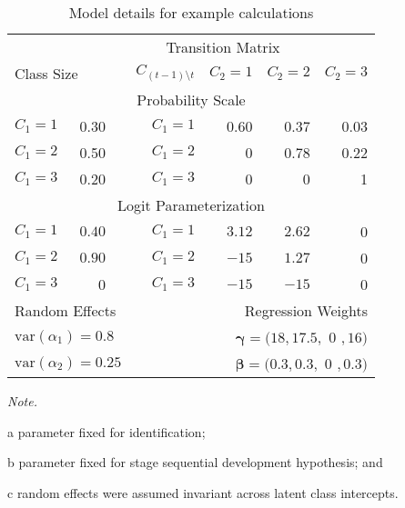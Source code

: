 \documentclass[12pt]{article}
\begin{document}
\begin{table}[!htp]
\centering
\begin{threeparttable}
\caption{Model details for example calculations}
\label{tb:mlta-model}
\begin{tabular}{l r c r r r r}
\toprule
& & & \multicolumn{3}{c}{Transition Matrix}\\ \cmidrule(lr){4-7}
\multicolumn{2}{l}{Class Size} & & $C_{(t-1)\setminus t}$ & $C_2 =1$ & $C_2 =2$ & $C_2 =3$   \\ \midrule
\multicolumn{7}{c}{Probability Scale}\\
$C_1 =1$	& 0.30 & &  $C_1 =1$	& 0.60  & 0.37 & 0.03 \\
$C_1 =2$	& 0.50 & &  $C_1 =2$	&  0\tnote{b}     & 0.78 & 0.22\\
$C_1 =3$	& 0.20 & &  $C_1 =3$	&  0\tnote{b}     & 0\tnote{b}     & 1\\
\multicolumn{7}{c}{Logit Parameterization}\\
$C_1 =1$	& $0.40$   & & $C_1 =1$	&  $3.12$ &  $2.62$ & 0\tnote{a}\\
$C_1 =2$	& $0.90$    & & $C_1 =2$	& $-15$\tnote{b} &  $1.27$ & 0\tnote{a} \\
$C_1 =3$	& 0\tnote{a} & & $C_1 =3$	& $-15$\tnote{b} &  $-15$\tnote{b} & 0\tnote{a} \\ \midrule
\multicolumn{3}{l}{Random Effects\tnote{c}} & &\multicolumn{3}{r}{Regression Weights}\\ 
\multicolumn{3}{l}{$\mathrm{var}(\alpha_1) = 0.8$} & &\multicolumn{3}{r}{${\bm \gamma} = (18, 17.5,$ 0\tnote{b} $, 16)$}\\ 
\multicolumn{3}{l}{$\mathrm{var}(\alpha_2) = 0.25$} & &\multicolumn{3}{r}{${\bm \beta} = (0.3, 0.3,$ 0\tnote{b} $, 0.3)$}\\
 \bottomrule
\end{tabular}
 	\begin{tablenotes}
    {\small
        \textit{Note.} \ \item[a]parameter fixed for identification; \item[b]parameter fixed for stage sequential development hypothesis; and \item[c]random effects were assumed invariant across latent class intercepts.
    }
 	\end{tablenotes}
 \end{threeparttable}
\end{table}
\end{document}
